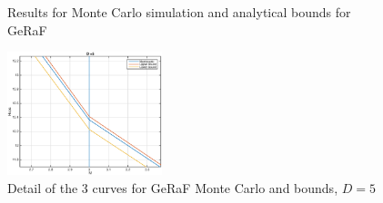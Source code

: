 \documentclass[10pt]{article}
\begin{document}
\begin{figure}[h!]
  \centering
  \caption{Results for Monte Carlo simulation and analytical bounds for GeRaF}
  \label{fig:geraf2}
\end{figure}

\begin{figure}[H]
  \centering
  \includegraphics[width= 0.4\textwidth]{GeRaF_detail}
  \caption{Detail of the 3 curves for GeRaF Monte Carlo and bounds, $D = 5$}
  \label{fig:geraf3}
\end{figure}
\end{document}
